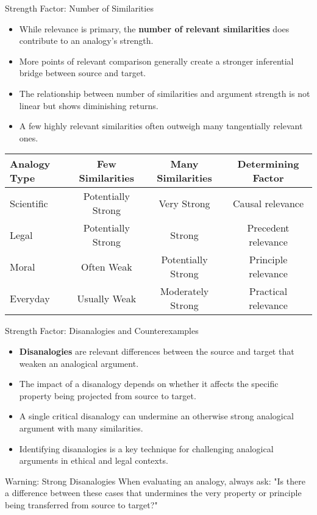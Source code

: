 \documentclass{beamer}
\begin{document}
	\begin{frame}{Strength Factor: Number of Similarities}
		\begin{itemize}
			\item While relevance is primary, the \textbf{number of relevant similarities} does contribute to an analogy's strength.
			\item More points of relevant comparison generally create a stronger inferential bridge between source and target.
			\item The relationship between number of similarities and argument strength is not linear but shows diminishing returns.
			\item A few highly relevant similarities often outweigh many tangentially relevant ones.
		\end{itemize}
		
		\begin{table}
				\scriptsize
			\begin{tabular}{|l|c|c|c|}
				\hline
				\textbf{Analogy Type} & \textbf{Few Similarities} & \textbf{Many Similarities} & \textbf{Determining Factor} \\
				\hline
				Scientific & Potentially Strong & Very Strong & Causal relevance \\
				Legal & Potentially Strong & Strong & Precedent relevance \\
				Moral & Often Weak & Potentially Strong & Principle relevance \\
				Everyday & Usually Weak & Moderately Strong & Practical relevance \\
				\hline
			\end{tabular}
		\end{table}
	\end{frame}
	
	\begin{frame}{Strength Factor: Disanalogies and Counterexamples}
		\begin{itemize}
			\item \textbf{Disanalogies} are relevant differences between the source and target that weaken an analogical argument.
			\item The impact of a disanalogy depends on whether it affects the specific property being projected from source to target.
			\item A single critical disanalogy can undermine an otherwise strong analogical argument with many similarities.
			\item Identifying disanalogies is a key technique for challenging analogical arguments in ethical and legal contexts.
		\end{itemize}
		
		\begin{alertblock}{Warning: Strong Disanalogies}
			When evaluating an analogy, always ask: "Is there a difference between these cases that undermines the very property or principle being transferred from source to target?"
		\end{alertblock}
	\end{frame}
	
\end{document}
